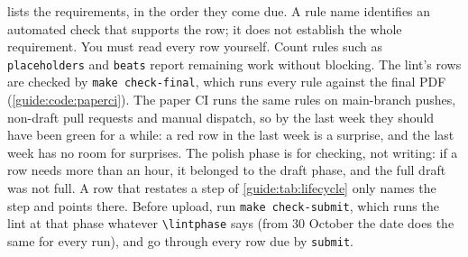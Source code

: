  lists the requirements, in the order they come due. A rule name identifies an automated check that supports the row; it does not establish the whole requirement. You must read every row yourself. Count rules such as \texttt{placeholders} and \texttt{beats} report remaining work without blocking. The lint's rows are checked by \texttt{make check-final}, which runs every rule against the final PDF (\cref{guide:code:paperci}). The paper CI runs the same rules on main-branch pushes, non-draft pull requests and manual dispatch, so by the last week they should have been green for a while: a red row in the last week is a surprise, and the last week has no room for surprises. The polish phase is for checking, not writing: if a row needs more than an hour, it belonged to the draft phase, and the full draft was not full. A row that restates a step of \cref{guide:tab:lifecycle} only names the step and points there. Before upload, run \texttt{make check-submit}, which runs the lint at that phase whatever \texttt{\textbackslash lintphase} says (from 30 October the date does the same for every run), and go through every row due by \texttt{submit}.
